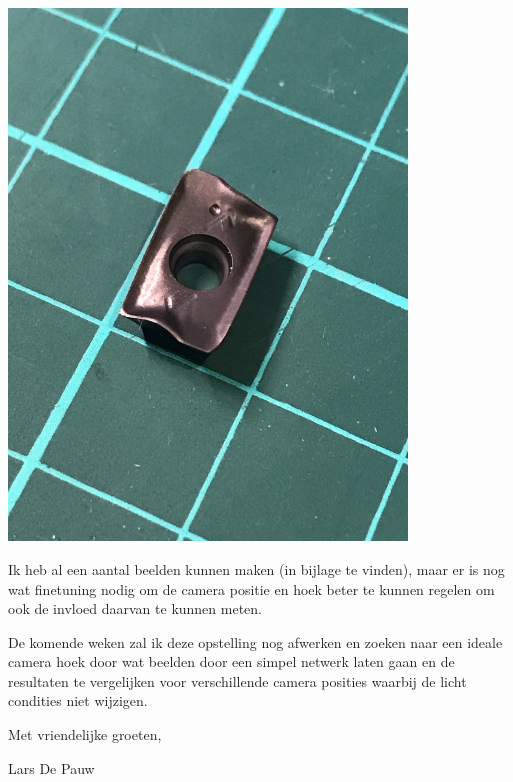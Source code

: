 \documentclass{scrartcl}
\begin{document}
\includegraphics[width=4.166667in, keepaspectratio=true]{./Masterproef_Tool_Wear_Inspection_-_Update_4_TG/plaatje_1cm.jpeg}



Ik heb al een aantal beelden kunnen maken (in bijlage te vinden), maar er is nog wat finetuning nodig om de camera positie en hoek beter te kunnen regelen om ook de invloed daarvan te kunnen meten.

De komende weken zal ik deze opstelling nog afwerken en zoeken naar een ideale camera hoek door wat beelden door een simpel netwerk laten gaan en de resultaten te vergelijken voor verschillende camera posities waarbij de licht condities niet wijzigen.

 

Met vriendelijke groeten,

 

Lars De Pauw
\end{document}
